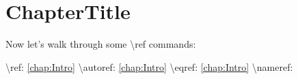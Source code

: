 \chapter[ChapterShortTitle]{ChapterTitle}

Now let's walk through some \textbackslash ref commands:

\begin{exe}
    \ex \textbackslash ref: \ref{chap:Intro}
    \ex \textbackslash autoref: \autoref{chap:Intro}
    \ex \textbackslash eqref: \eqref{chap:Intro}
    \ex \textbackslash nameref: 
    
\end{exe}